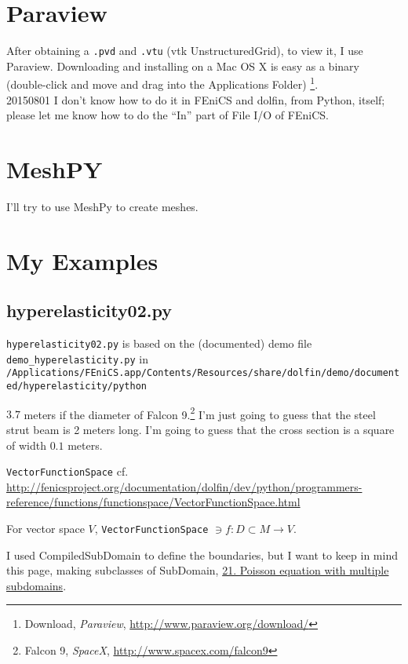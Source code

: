 \documentclass[twoside,landscape,10pt]{amsart}
\theoremstyle{plain}
\theoremstyle{definition}
\theoremstyle{remark}
\begin{document}
\begin{multicols*}{2}
\section{Paraview}

After obtaining a \verb|.pvd| and \verb|.vtu| (vtk UnstructuredGrid), to view it, I use Paraview.  Downloading and installing on a Mac OS X is easy as a binary (double-click and move and drag into the Applications Folder) \footnote{Download, \emph{Paraview}, \url{http://www.paraview.org/download/}}.  \\
20150801 I don't know how to do it in FEniCS and dolfin, from Python, itself; please let me know how to do the ``In'' part of File I/O of FEniCS.  

\section{MeshPY}

I'll try to use MeshPy to create meshes.

\section{My Examples}



\subsection{hyperelasticity02.py}

\verb|hyperelasticity02.py| is based on the (documented) demo file \verb|demo_hyperelasticity.py| in \verb|/Applications/FEniCS.app/Contents/Resources/share/dolfin/demo/documented/hyperelasticity/python|

$3.7 $ meters if the diameter of Falcon 9.\footnote{Falcon 9, \emph{SpaceX}, \url{http://www.spacex.com/falcon9}}  I'm just going to guess that the steel strut beam is 2 meters long.  I'm going to guess that the cross section is a square of width $0.1$ meters.  

\verb|VectorFunctionSpace| cf. \url{http://fenicsproject.org/documentation/dolfin/dev/python/programmers-reference/functions/functionspace/VectorFunctionSpace.html}

For vector space $V$, \verb|VectorFunctionSpace| $\ni f: D \subset M \to V$.  

I used CompiledSubDomain to define the boundaries, but I want to keep in mind this page, making subclasses of SubDomain, \href{http://fenicsproject.org/documentation/dolfin/dev/python/demo/pde/subdomains-poisson/python/documentation.html}{21. Poisson equation with multiple subdomains}.  


\end{multicols*}
\end{document}

